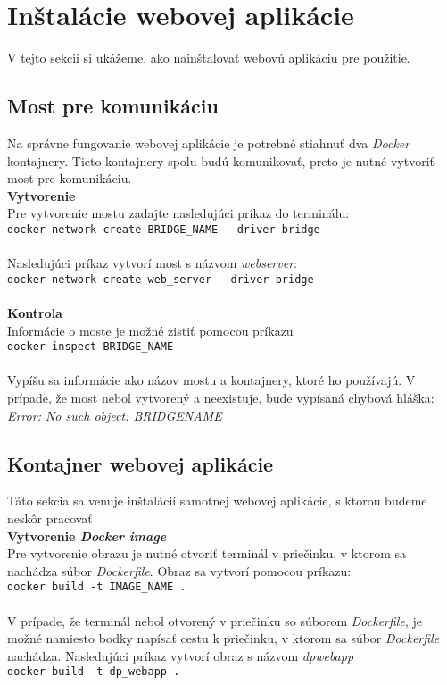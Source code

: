 \section{Inštalácie webovej aplikácie}
V tejto sekcií si ukážeme, ako nainštalovať webovú aplikáciu pre použitie.

\subsection{Most pre komunikáciu}

Na správne fungovanie webovej aplikácie je potrebné stiahnuť dva \textit{Docker} kontajnery. Tieto kontajnery spolu budú komunikovať, preto je nutné vytvoriť most pre komunikáciu.\\

\textbf{Vytvorenie}\\
Pre vytvorenie mostu zadajte nasledujúci príkaz do terminálu:\\
\indent \verb|docker network create BRIDGE_NAME --driver bridge|\\\\
Nasledujúci príkaz vytvorí most s názvom \textit{web\textunderscore server}:\\
\indent \verb|docker network create web_server --driver bridge|\\\\

\textbf{Kontrola}\\
Informácie o moste je možné zistiť pomocou príkazu\\
\indent \verb|docker inspect BRIDGE_NAME|\\\\
Vypíšu sa informácie ako názov mostu a kontajnery, ktoré ho používajú. V prípade, že most nebol vytvorený a neexistuje, bude vypísaná chybová hláška: \textit{Error: No such object: BRIDGE\textunderscore NAME}

\subsection{Kontajner webovej aplikácie}

Táto sekcia sa venuje inštalácií samotnej webovej aplikácie, s ktorou budeme neskôr pracovať\\

\textbf{Vytvorenie \textit{Docker image}}\\
Pre vytvorenie obrazu je nutné otvoriť terminál v priečinku, v ktorom sa nachádza súbor \textit{Dockerfile}. Obraz sa vytvorí pomocou príkazu:\\
\indent \verb|docker build -t IMAGE_NAME . |\\\\
V prípade, že terminál nebol otvorený v priečinku so súborom \textit{Dockerfile}, je možné namiesto bodky napísať cestu k priečinku, v ktorom sa súbor \textit{Dockerfile} nachádza. Nasledujúci príkaz vytvorí obraz s názvom \textit{dp\textunderscore webapp}\\
\indent \verb|docker build -t dp_webapp .|\\

